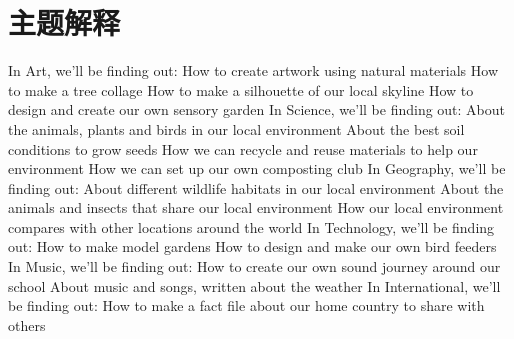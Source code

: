 \chapter{主题解释}
In Art, we’ll be finding out:
How to create artwork using natural materials How to make a tree collage
How to make a silhouette of our local skyline How to design and create our own sensory garden
In Science, we’ll be finding out:
About the animals, plants and birds in our local environment About the best soil conditions to grow seeds
How we can recycle and reuse materials to help our environment How we can set up our own composting club
In Geography, we’ll be finding out:
About different wildlife habitats in our local environment
About the animals and insects that share our local environment
How our local environment compares with other locations around the world
In Technology, we’ll be finding out:
How to make model gardens
How to design and make our own bird feeders
In Music, we’ll be finding out:
How to create our own sound journey around our school About music and songs, written about the weather
In International, we’ll be finding out:
How to make a fact file about our home country to share with others
